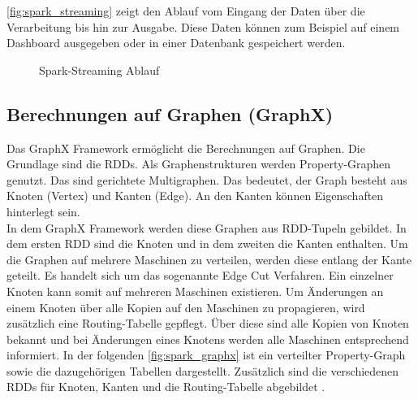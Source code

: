 \noindent
\autoref{fig:spark_streaming} zeigt den Ablauf vom Eingang der Daten über die Verarbeitung bis hin zur Ausgabe. Diese Daten können zum Beispiel auf einem Dashboard ausgegeben oder in einer Datenbank gespeichert werden.

\begin{figure}[h]
  \centering
  \caption{Spark-Streaming Ablauf \cite{INFOQ_STREAMING}}\label{fig:spark_streaming}
\end{figure}





\newpage
\subsection{Berechnungen auf Graphen (GraphX)}

Das GraphX Framework ermöglicht die Berechnungen auf Graphen. Die Grundlage sind die RDDs. Als Graphenstrukturen werden Property-Graphen genutzt.
Das sind gerichtete Multigraphen. Das bedeutet, der Graph besteht aus Knoten (Vertex) und Kanten (Edge). An den Kanten können Eigenschaften hinterlegt sein.\\

\noindent
In dem GraphX Framework werden diese Graphen aus RDD-Tupeln gebildet. In dem ersten RDD sind die Knoten und in dem zweiten die Kanten enthalten. Um die Graphen auf mehrere Maschinen zu verteilen, werden diese entlang der Kante geteilt. Es handelt sich um das sogenannte Edge Cut Verfahren. Ein einzelner Knoten kann somit auf mehreren Maschinen existieren. Um Änderungen an einem Knoten über alle Kopien auf den Maschinen zu propagieren, wird zusätzlich eine Routing-Tabelle gepflegt. Über diese sind alle Kopien von Knoten bekannt und bei Änderungen eines Knotens werden alle Maschinen entsprechend informiert. 
In der folgenden \autoref{fig:spark_graphx} ist ein verteilter Property-Graph sowie die dazugehörigen Tabellen dargestellt. Zusätzlich sind die verschiedenen RDDs für Knoten, Kanten und die Routing-Tabelle abgebildet \cite{AAWS15}. \\

